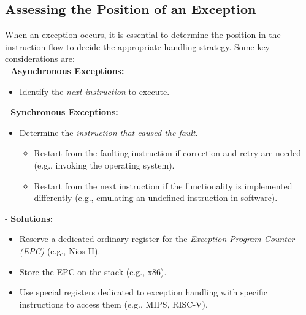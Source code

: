 \subsection{Assessing the Position of an Exception}
When an exception occurs, it is essential to determine the position in the instruction flow to decide the appropriate handling strategy. Some key considerations are: \\
- \textbf{Asynchronous Exceptions:} 
\begin{itemize}
    \item Identify the \textit{next instruction} to execute.
\end{itemize}
- \textbf{Synchronous Exceptions:} \\
\begin{itemize}
    \item Determine the \textit{instruction that caused the fault}.
    \begin{itemize}
        \item Restart from the faulting instruction if correction and retry are needed (e.g., invoking the operating system).
        \item Restart from the next instruction if the functionality is implemented differently (e.g., emulating an undefined instruction in software).
    \end{itemize}
\end{itemize}
- \textbf{Solutions:} \\
\begin{itemize}
    \item Reserve a dedicated ordinary register for the \textit{Exception Program Counter (EPC)} (e.g., Nios II).
    \item Store the EPC on the stack (e.g., x86).
    \item Use special registers dedicated to exception handling with specific instructions to access them (e.g., MIPS, RISC-V).
\end{itemize}
